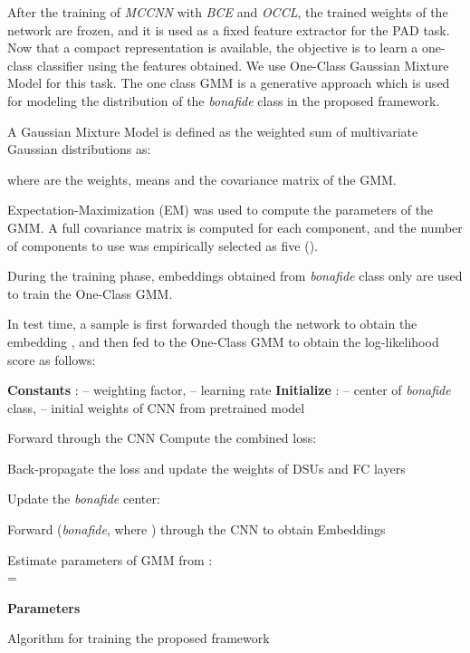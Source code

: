 \documentclass[journal]{IEEEtran}
\begin{document}
After the training of \textit{MCCNN} with \textit{BCE} and \textit{OCCL}, the trained weights of the network are frozen, and it is used as a fixed feature extractor for the PAD task. Now that a compact representation is available, the objective is to learn a one-class classifier using the features obtained. We use  One-Class Gaussian Mixture Model for this task. The one class GMM is a generative approach which is used for modeling the distribution of the \textit{bonafide} class in the proposed framework.

A Gaussian Mixture Model is defined as the weighted sum of  multivariate Gaussian distributions as:



where  are the weights, means and the covariance matrix of the GMM.

Expectation-Maximization (EM) \cite{Dempster77maximumlikelihood} was used to compute the parameters of the GMM. A full covariance matrix is computed for each component, and the number of components to use was empirically selected as five ().

During the training phase, embeddings obtained from \textit{bonafide} class only are used to train the One-Class GMM.

In test time, a sample is first forwarded though the network to obtain the embedding , and then fed to the One-Class GMM to obtain the log-likelihood score as follows:



\begin{algorithm}[h]
\label{alg:algo_framework}
\SetAlgoLined
\DontPrintSemicolon

\textbf{Constants} :  -- weighting factor,  -- learning rate \;
\textbf{Initialize} :  -- center of \textit{bonafide} class,  -- initial weights of CNN from pretrained model \

 {

Forward  through the CNN \;
Compute the combined loss:  \;

Back-propagate the loss and update the weights of DSUs and FC layers \;

Update the \textit{bonafide} center: \\  \;

}

Forward  (\textit{bonafide}, where ) through the CNN to obtain Embeddings  \;

Estimate parameters of GMM from :\\ =  \;

\textbf{Parameters} \;

\caption{Algorithm for training the proposed framework}
\end{algorithm}
\end{document}
